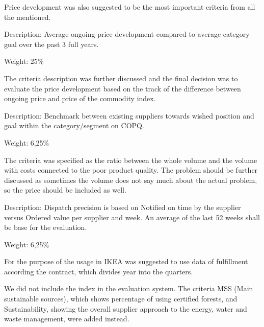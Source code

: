 \documentclass[oneside,12pt]{article}%
\begin{document}
Price development was also suggested to be the most important criteria from all the mentioned.


Description: Average ongoing price development compared to average category goal over the past 3 full years. \par

\vspace{2mm}
\noindent Weight: 25\%
\vspace{2mm}

The criteria description was further discussed and the final decision was to evaluate the price development based on the track of the difference between ongoing price and price of the commodity index.


Description: Benchmark between existing suppliers towards wished position and goal within the category/segment on COPQ.

\vspace{2mm}
\noindent Weight: 6,25\%
\vspace{2mm}

The criteria was specified as the ratio between the whole volume and the volume with costs connected to the poor product quality. The problem should be further discussed as sometimes the volume does not say much about the actual problem, so the price should be included as well.


Description: Dispatch precision is based on Notified on time by the supplier versus Ordered value per supplier and week. An average of the last 52 weeks shall be base for the evaluation. \par

\vspace{2mm}
\noindent Weight: 6,25\%
\vspace{2mm} \par

For the purpose of the usage in IKEA was suggested to use data of fulfillment according the contract, which divides year into the quarters.

We did not include the index in the evaluation system. The criteria MSS (Main sustainable sources), which shows percentage of using certified forests, and Sustainability, showing the overall supplier approach to the energy, water and waste management, were added instead. \par
\end{document}
